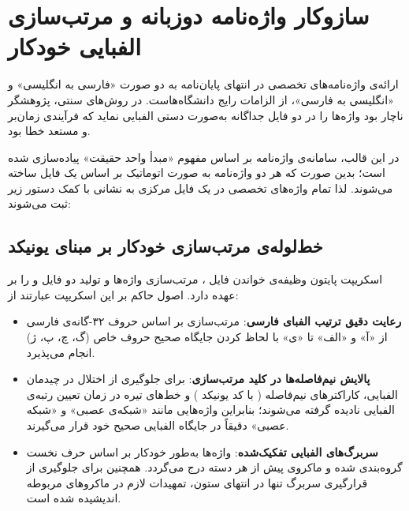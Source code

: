 

\section{سازوکار واژه‌نامه دوزبانه و مرتب‌سازی الفبایی خودکار}\label{sec:app_dictionary_and_glossary}

ارائه‌ی واژه‌نامه‌های تخصصی در انتهای پایان‌نامه به دو صورت «فارسی به انگلیسی» و «انگلیسی به فارسی»، از الزامات رایج دانشگاه‌هاست. در روش‌های سنتی، پژوهشگر ناچار بود واژه‌ها را در دو فایل جداگانه به‌صورت دستی الفبایی نماید که فرآیندی زمان‌بر و مستعد خطا بود.

در این قالب، سامانه‌ی واژه‌نامه بر اساس مفهوم «مبدأ واحد حقیقت» پیاده‌سازی شده است؛ بدین صورت که هر دو واژه‌نامه به صورت اتوماتیک بر اساس یک فایل ساخته می‌شوند. لذا تمام واژه‌های تخصصی در یک فایل مرکزی به نشانی  با کمک دستور زیر ثبت می‌شوند:
\begin{center}
\end{center}


\subsection{خط‌لوله‌ی مرتب‌سازی خودکار بر مبنای یونیکد}

اسکریپت پایتون  وظیفه‌ی خواندن فایل ، مرتب‌سازی واژه‌ها و تولید دو فایل  و  را بر عهده دارد. اصول حاکم بر این اسکریپت عبارتند از:
\begin{itemize}
    \item \textbf{رعایت دقیق ترتیب الفبای فارسی}: مرتب‌سازی بر اساس حروف ۳۲‌-گانه‌ی فارسی از «آ» و «الف» تا «ی» با لحاظ کردن جایگاه صحیح حروف خاص (گ، چ، پ، ژ) انجام می‌پذیرد.
    \item \textbf{پالایش نیم‌فاصله‌ها در کلید مرتب‌سازی}: برای جلوگیری از اختلال در چیدمان الفبایی، کاراکترهای نیم‌فاصله ( با کد یونیکد ) و خط‌های تیره در زمان تعیین رتبه‌ی الفبایی نادیده گرفته می‌شوند؛ بنابراین واژه‌هایی مانند «شبکه‌ی عصبی» و «شبکه عصبی» دقیقاً در جایگاه الفبایی صحیح خود قرار می‌گیرند.
    \item \textbf{سربرگ‌های الفبایی تفکیک‌شده}: واژه‌ها به‌طور خودکار بر اساس حرف نخست گروه‌بندی شده و ماکروی  پیش از هر دسته درج می‌گردد. همچنین برای جلوگیری از قرارگیری سربرگ تنها در انتهای ستون، تمهیدات لازم در ماکروهای مربوطه اندیشیده شده است.
\end{itemize}


